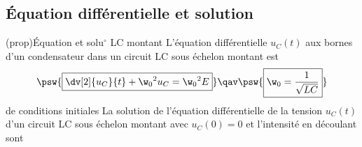 \documentclass[../../main/main.tex]{subfiles}
\begin{document}
\subsection{Équation différentielle et solution}
\begin{tcb}[label=prop:eqdiffrc, sidebyside, righthand ratio=.4]
	(prop){Équation et solu$^\circ$ LC montant}
	L'équation différentielle $u_C(t)$ aux bornes d'un
	condensateur dans un circuit LC sous échelon montant est
	\[
		\psw{%
			\boxed{\dv[2]{u_C}{t} + \w_0{}^2u_C = \w_0{}^{2}E}
		}%
		\qav
		\psw{%
			\boxed{\w_0 = \frac{1}{\sqrt{LC}}}
		}%
	\]
	de conditions initiales
	\vspace{-15pt}
	\tcblower
	La solution de l'équation différentielle de la tension $u_C(t)$
	d'un circuit LC sous échelon montant avec $u_C(0) = 0$ et l'intensité en
	découlant sont
\end{tcb}
\end{document}
